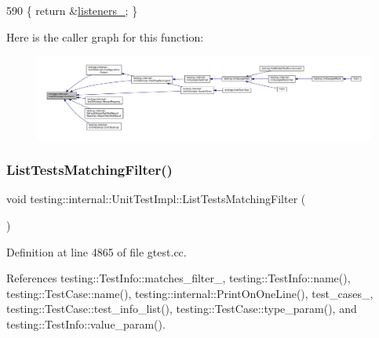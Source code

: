 \begin{DoxyCode}
590 \{ \textcolor{keywordflow}{return} &\hyperlink{classtesting_1_1internal_1_1UnitTestImpl_a16c3caa0bac1a8dce650649760de30d2}{listeners\_}; \}
\end{DoxyCode}
Here is the caller graph for this function\+:
\nopagebreak
\begin{figure}[H]
\begin{center}
\leavevmode
\includegraphics[width=350pt]{classtesting_1_1internal_1_1UnitTestImpl_a67211f8475936f88d0e4d30f841c0da4_icgraph}
\end{center}
\end{figure}
\mbox{\label{classtesting_1_1internal_1_1UnitTestImpl_ad2cfedef41d3d29aad23c2c64214e6f3}} 
\subsubsection{\texorpdfstring{List\+Tests\+Matching\+Filter()}{ListTestsMatchingFilter()}}
{\footnotesize\ttfamily void testing\+::internal\+::\+Unit\+Test\+Impl\+::\+List\+Tests\+Matching\+Filter (\begin{DoxyParamCaption}{ }\end{DoxyParamCaption})}



Definition at line 4865 of file gtest.\+cc.



References testing\+::\+Test\+Info\+::matches\+\_\+filter\+\_\+, testing\+::\+Test\+Info\+::name(), testing\+::\+Test\+Case\+::name(), testing\+::internal\+::\+Print\+On\+One\+Line(), test\+\_\+cases\+\_\+, testing\+::\+Test\+Case\+::test\+\_\+info\+\_\+list(), testing\+::\+Test\+Case\+::type\+\_\+param(), and testing\+::\+Test\+Info\+::value\+\_\+param().



